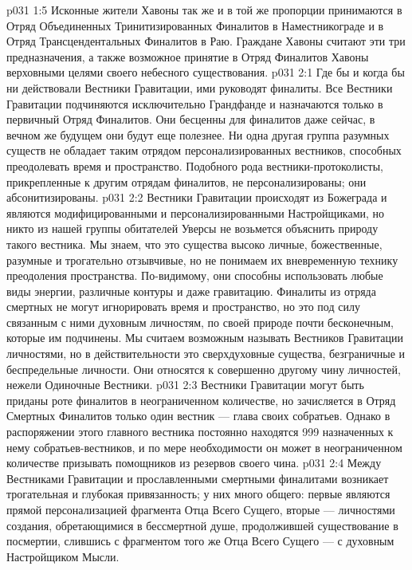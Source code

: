 \vs p031 1:5 Исконные жители Хавоны так же и в той же пропорции принимаются в Отряд Объединенных Тринитизированных Финалитов в Наместникограде и в Отряд Трансцендентальных Финалитов в Раю. Граждане Хавоны считают эти три предназначения, а также возможное принятие в Отряд Финалитов Хавоны верховными целями своего небесного существования.
\vs p031 2:1 Где бы и когда бы ни действовали Вестники Гравитации, ими руководят финалиты. Все Вестники Гравитации подчиняются исключительно Грандфанде и назначаются только в первичный Отряд Финалитов. Они бесценны для финалитов даже сейчас, в вечном же будущем они будут еще полезнее. Ни одна другая группа разумных существ не обладает таким отрядом персонализированных вестников, способных преодолевать время и пространство. Подобного рода вестники\hyp{}протоколисты, прикрепленные к другим отрядам финалитов, не персонализированы; они абсонитизированы.
\vs p031 2:2 \pc Вестники Гравитации происходят из Божеграда и являются модифицированными и персонализированными Настройщиками, но никто из нашей группы обитателей Уверсы не возьмется объяснить природу такого вестника. Мы знаем, что это существа высоко личные, божественные, разумные и трогательно отзывчивые, но не понимаем их вневременную технику преодоления пространства. По\hyp{}видимому, они способны использовать любые виды энергии, различные контуры и даже гравитацию. Финалиты из отряда смертных не могут игнорировать время и пространство, но это под силу связанным с ними духовным личностям, по своей природе почти бесконечным, которые им подчинены. Мы считаем возможным называть Вестников Гравитации личностями, но в действительности это сверхдуховные существа, безграничные и беспредельные личности. Они относятся к совершенно другому чину личностей, нежели Одиночные Вестники.
\vs p031 2:3 \pc Вестники Гравитации могут быть приданы роте финалитов в неограниченном количестве, но зачисляется в Отряд Смертных Финалитов только один вестник --- глава своих собратьев. Однако в распоряжении этого главного вестника постоянно находятся 999 назначенных к нему собратьев\hyp{}вестников, и по мере необходимости он может в неограниченном количестве призывать помощников из резервов своего чина.
\vs p031 2:4 Между Вестниками Гравитации и прославленными смертными финалитами возникает трогательная и глубокая привязанность; у них много общего: первые являются прямой персонализацией фрагмента Отца Всего Сущего, вторые --- личностями создания, обретающимися в бессмертной душе, продолжившей существование в посмертии, слившись с фрагментом того же Отца Всего Сущего --- с духовным Настройщиком Мысли.
